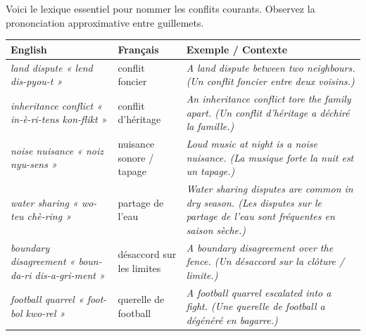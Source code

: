 \documentclass[11pt]{article}
\newcommand{\eng}[1]{\ifmmode\text{\textit{#1}}\else\begingroup\selectlanguage{english}\itshape #1\endgroup\fi}
\begin{document}
\begin{propriete}
Voici le lexique essentiel pour nommer les conflits courants. Observez la prononciation approximative entre guillemets.
\begin{center}
\begin{tabularx}{\linewidth}{|X|X|X|}\hline
\rowcolor{popblueL} \textbf{English} & \textbf{Français} & \textbf{Exemple / Contexte} \\ \hline
\eng{land dispute} « lend dis-pyou-t » & conflit foncier & \eng{A land dispute between two neighbours.} (Un conflit foncier entre deux voisins.) \\ \hline
\eng{inheritance conflict} « in-è-ri-tens kon-flikt » & conflit d'héritage & \eng{An inheritance conflict tore the family apart.} (Un conflit d'héritage a déchiré la famille.) \\ \hline
\eng{noise nuisance} « noiz nyu-sens » & nuisance sonore / tapage & \eng{Loud music at night is a noise nuisance.} (La musique forte la nuit est un tapage.) \\ \hline
\eng{water sharing} « wo-teu chè-ring » & partage de l'eau & \eng{Water sharing disputes are common in dry season.} (Les disputes sur le partage de l'eau sont fréquentes en saison sèche.) \\ \hline
\eng{boundary disagreement} « boun-da-ri dis-a-gri-ment » & désaccord sur les limites & \eng{A boundary disagreement over the fence.} (Un désaccord sur la clôture / limite.) \\ \hline
\eng{football quarrel} « foot-bol kwo-rel » & querelle de football & \eng{A football quarrel escalated into a fight.} (Une querelle de football a dégénéré en bagarre.) \\ \hline
\end{tabularx}
\end{center}
\end{propriete}
\end{document}
